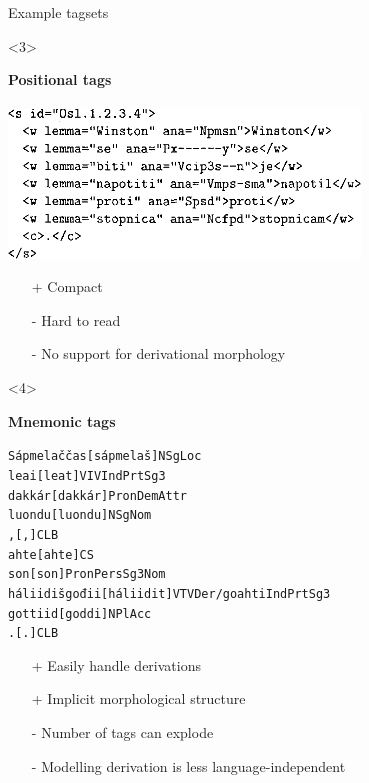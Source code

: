 \documentclass{beamer}
\begin{document}
\begin{frame}{Example tagsets}
\begin{onlyenv}<3>
\begin{center}
\textbf{Positional tags} 
~\\
~\\

\includegraphics[width=0.7\textwidth]{images/12-Figure5-1.png}
\end{center}

\begin{itemize}
 \item[+] Compact
 \item[-] Hard to read 
 \item[-] No support for derivational morphology
\end{itemize}

\end{onlyenv}

\begin{onlyenv}<4>
\begin{center}
\textbf{Mnemonic tags} 

\end{center}
{\tiny
\begin{alltt}
Sápmelaččas	[sápmelaš] N Sg Loc \\
leai	[leat] V IV Ind Prt Sg3 \\
dakkár	[dakkár] Pron Dem Attr \\
luondu	[luondu] N Sg Nom \\
,	[,] CLB \\
ahte	[ahte] CS \\
son	[son] Pron Pers Sg3 Nom \\
háliidišgođii	[háliidit] V TV Der/goahti Ind Prt Sg3 \\
gottiid	[goddi] N Pl Acc \\
.	[.] CLB \\
\end{alltt}
}
\begin{itemize}
  \item[+] Easily handle derivations
  \item[+] Implicit morphological structure
  \item[-] Number of tags can explode
  \item[-] Modelling derivation is less language-independent
\end{itemize}


\end{onlyenv}
\end{frame}
\end{document}
